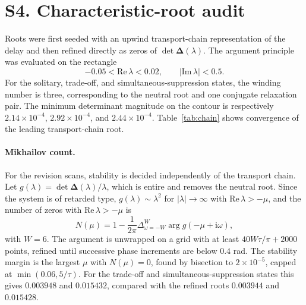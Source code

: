 \documentclass[11pt]{article}
\newcommand{\ii}{\mathrm{i}}
\newcommand{\Dmat}{\bm{\Delta}}
\newif\ifmarked
\newenvironment{revised}{\ifmarked\color{blue}\fi}{}
\begin{document}
\section*{S4. Characteristic-root audit}

Roots were first seeded with an upwind transport-chain representation of the delay and then refined directly as zeros of $\det\Dmat(\lambda)$. The argument principle was evaluated on the rectangle
\begin{equation}
-0.05<\mathrm{Re}\,\lambda<0.02,\qquad |\mathrm{Im}\,\lambda|<0.5.
\end{equation}
For the solitary, trade-off, and simultaneous-suppression states, the winding number is three, corresponding to the neutral root and one conjugate relaxation pair. The minimum determinant magnitude on the contour is respectively $2.14\times10^{-4}$, $2.92\times10^{-4}$, and $2.44\times10^{-4}$. Table~\ref{tab:chain} shows convergence of the leading transport-chain root.

\begin{revised}\paragraph{Mikhailov count.} For the revision scans, stability is decided independently of the transport chain. Let $g(\lambda)=\det\Dmat(\lambda)/\lambda$, which is entire and removes the neutral root. Since the system is of retarded type, $g(\lambda)\sim\lambda^2$ for $|\lambda|\to\infty$ with $\mathrm{Re}\,\lambda>-\mu$, and the number of zeros with $\mathrm{Re}\,\lambda>-\mu$ is
\begin{equation}
N(\mu)=1-\frac{1}{2\pi}\Delta_{\omega=-W}^{W}\arg g(-\mu+\ii\omega),
\end{equation}
with $W=6$. The argument is unwrapped on a grid with at least $40W\tau/\pi+2000$ points, refined until successive phase increments are below $0.4$ rad. The stability margin is the largest $\mu$ with $N(\mu)=0$, found by bisection to $2\times10^{-5}$, capped at $\min(0.06,5/\tau)$. For the trade-off and simultaneous-suppression states this gives $0.003948$ and $0.015432$, compared with the refined roots $0.003944$ and $0.015428$.\end{revised}
\end{document}
